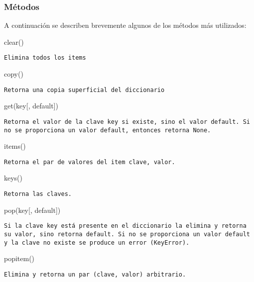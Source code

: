 \documentclass[a4paper,12pt,spanish]{sphinxmanual}
\begin{document}
\subsubsection{Métodos}
\label{Unidad03:id2}
A continuación se describen brevemente algunos de los métodos más
utilizados:

clear()

\begin{Verbatim}[commandchars=\\\{\}]
Elimina todos los items
\end{Verbatim}

copy()

\begin{Verbatim}[commandchars=\\\{\}]
Retorna una copia superficial del diccionario
\end{Verbatim}

get(key{[}, default{]})

\begin{Verbatim}[commandchars=\\\{\}]
Retorna el valor de la clave key si existe, sino el valor default. Si no se proporciona un valor default, entonces retorna None.
\end{Verbatim}

items()

\begin{Verbatim}[commandchars=\\\{\}]
Retorna el par de valores del item clave, valor.
\end{Verbatim}

keys()

\begin{Verbatim}[commandchars=\\\{\}]
Retorna las claves.
\end{Verbatim}

pop(key{[}, default{]})

\begin{Verbatim}[commandchars=\\\{\}]
Si la clave key está presente en el diccionario la elimina y retorna su valor, sino retorna default. Si no se proporciona un valor default y la clave no existe se produce un error (KeyError).
\end{Verbatim}

popitem()

\begin{Verbatim}[commandchars=\\\{\}]
Elimina y retorna un par (clave, valor) arbitrario.
\end{Verbatim}
\end{document}
